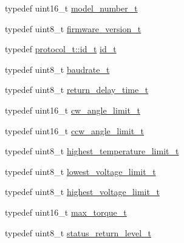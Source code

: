 \begin{DoxyCompactItemize}
\item 
typedef uint16\+\_\+t \hyperlink{structdynamixel_1_1servos_1_1_model_traits_3_01_ax12_w_01_4_1_1_c_t_af5412c568fedd8e7edafc661e0491d68}{model\+\_\+number\+\_\+t}
\item 
typedef uint8\+\_\+t \hyperlink{structdynamixel_1_1servos_1_1_model_traits_3_01_ax12_w_01_4_1_1_c_t_aa61f7757be737a9ab341252a458292b6}{firmware\+\_\+version\+\_\+t}
\item 
typedef \hyperlink{classdynamixel_1_1protocols_1_1_protocol1_a1d4dfa22b01f80b1876d14f539d52b5c}{protocol\+\_\+t\+::id\+\_\+t} \hyperlink{structdynamixel_1_1servos_1_1_model_traits_3_01_ax12_w_01_4_1_1_c_t_ad1d73c38ace40298d1def19ccd71ee7c}{id\+\_\+t}
\item 
typedef uint8\+\_\+t \hyperlink{structdynamixel_1_1servos_1_1_model_traits_3_01_ax12_w_01_4_1_1_c_t_aaec3eca4744dc4206abfa926a690852d}{baudrate\+\_\+t}
\item 
typedef uint8\+\_\+t \hyperlink{structdynamixel_1_1servos_1_1_model_traits_3_01_ax12_w_01_4_1_1_c_t_ab07f34850ed21d0fceb2f8ebe51352e5}{return\+\_\+delay\+\_\+time\+\_\+t}
\item 
typedef uint16\+\_\+t \hyperlink{structdynamixel_1_1servos_1_1_model_traits_3_01_ax12_w_01_4_1_1_c_t_ad630b10770df9919fa58fbd825257d5a}{cw\+\_\+angle\+\_\+limit\+\_\+t}
\item 
typedef uint16\+\_\+t \hyperlink{structdynamixel_1_1servos_1_1_model_traits_3_01_ax12_w_01_4_1_1_c_t_a5857379da7fa838257f028b61ed28639}{ccw\+\_\+angle\+\_\+limit\+\_\+t}
\item 
typedef uint8\+\_\+t \hyperlink{structdynamixel_1_1servos_1_1_model_traits_3_01_ax12_w_01_4_1_1_c_t_a7819345095f43ad311af123b395c85cc}{highest\+\_\+temperature\+\_\+limit\+\_\+t}
\item 
typedef uint8\+\_\+t \hyperlink{structdynamixel_1_1servos_1_1_model_traits_3_01_ax12_w_01_4_1_1_c_t_a85c08e877faaf983835c3d844815d044}{lowest\+\_\+voltage\+\_\+limit\+\_\+t}
\item 
typedef uint8\+\_\+t \hyperlink{structdynamixel_1_1servos_1_1_model_traits_3_01_ax12_w_01_4_1_1_c_t_a9db3296d380e1f89ba56a508bbc843a9}{highest\+\_\+voltage\+\_\+limit\+\_\+t}
\item 
typedef uint16\+\_\+t \hyperlink{structdynamixel_1_1servos_1_1_model_traits_3_01_ax12_w_01_4_1_1_c_t_aadb15661626268ad57ab286db93c933c}{max\+\_\+torque\+\_\+t}
\item 
typedef uint8\+\_\+t \hyperlink{structdynamixel_1_1servos_1_1_model_traits_3_01_ax12_w_01_4_1_1_c_t_a97874870461108239960c35f9ddb49e4}{status\+\_\+return\+\_\+level\+\_\+t}

\end{DoxyCompactItemize}
